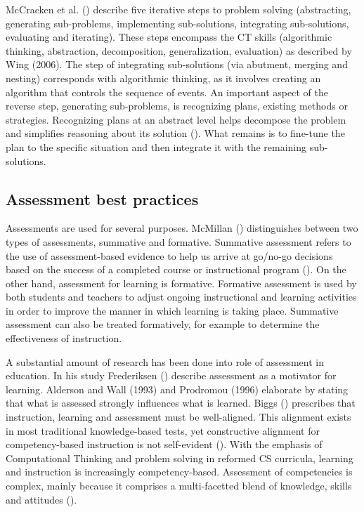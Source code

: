 

McCracken et al. (\cite{McCracken2001}) describe five iterative steps to problem solving (abstracting, generating sub-problems, implementing sub-solutions, integrating sub-solutions, evaluating and iterating). These steps encompass the CT skills (algorithmic thinking, abstraction, decomposition, generalization, evaluation) as described by Wing (2006). The step of integrating sub-solutions (via abutment, merging and nesting) corresponds with algorithmic thinking, as it involves creating an algorithm that controls the sequence of events. An important aspect of the reverse step, generating sub-problems, is recognizing plans, existing methods or strategies. Recognizing plans at an abstract level helps decompose the problem and simplifies reasoning about its solution (\cite{Smetsers2017}). What remains is to fine-tune the plan to the specific situation and then integrate it with the remaining sub-solutions.


\subsection{Assessment best practices}


Assessments are used for several purposes. McMillan (\cite{mcmillan2007formative}) distinguishes between two types of assessments, summative and formative. Summative assessment refers to the use of assessment-based evidence to help us arrive at go/no-go decisions based on the success of a completed course or instructional program (\cite{popham2009assessment}). On the other hand, assessment for learning is formative. Formative assessment is used by both students and teachers to adjust ongoing instructional and learning activities in order to improve the manner in which learning is taking place. Summative assessment can also be treated formatively, for example to determine the effectiveness of instruction.




A substantial amount of research has been done into role of assessment in education. In his study Frederiksen (\cite{frederiksen1984}) describe assessment as a motivator for learning. Alderson and Wall (1993) and Prodromou (1996) elaborate by stating that what is assessed strongly influences what is learned. Biggs (\cite{biggs1996}) prescribes that instruction, learning and assessment must be well-aligned. This alignment exists in most traditional knowledge-based tests, yet constructive alignment for competency-based instruction is not self-evident (\cite{baartman2006wheel}). With the emphasis of Computational Thinking and problem solving in reformed CS curricula, learning and instruction is increasingly competency-based. Assessment of competencies is complex, mainly because it comprises a multi-facetted blend of knowledge, skills and attitudes (\cite{merrienboer2002competenties}).

